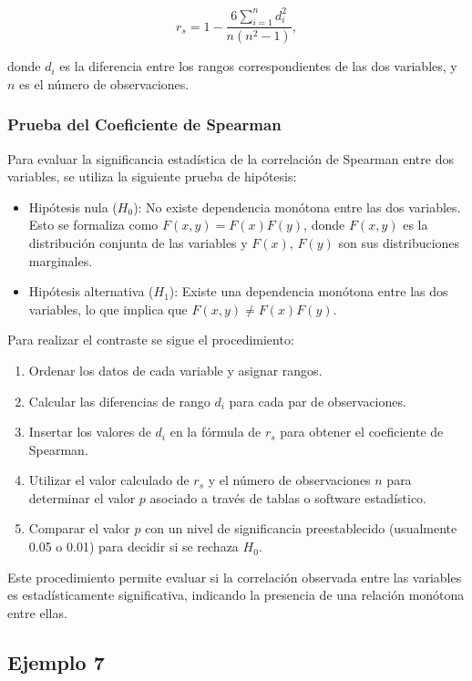 \documentclass{article}
\begin{document}
\[r_s = 1 - \frac{6 \sum_{i=1}^{n}d_i^2}{n(n^2 - 1)},\]

donde $d_i$ es la diferencia entre los rangos correspondientes de las dos variables, y $n$ es el número de observaciones.

\subsubsection*{Prueba del Coeficiente de Spearman}

Para evaluar la significancia estadística de la correlación de Spearman entre dos variables, se utiliza la siguiente prueba de hipótesis:

\begin{itemize}
    \item Hipótesis nula ($H_0$): No existe dependencia monótona entre las dos variables. Esto se formaliza como $F(x,y) = F(x)F(y)$, donde $F(x,y)$ es la distribución conjunta de las variables y $F(x)$, $F(y)$ son sus distribuciones marginales.
    \item Hipótesis alternativa ($H_1$): Existe una dependencia monótona entre las dos variables, lo que implica que $F(x,y) \neq F(x)F(y)$.
\end{itemize}

Para realizar el contraste se sigue el procedimiento:

\begin{enumerate}
    \item Ordenar los datos de cada variable y asignar rangos.
    \item Calcular las diferencias de rango $d_i$ para cada par de observaciones.
    \item Insertar los valores de $d_i$ en la fórmula de $r_s$ para obtener el coeficiente de Spearman.
    \item Utilizar el valor calculado de $r_s$ y el número de observaciones $n$ para determinar el valor $p$ asociado a través de tablas o software estadístico.
    \item Comparar el valor $p$ con un nivel de significancia preestablecido (usualmente 0.05 o 0.01) para decidir si se rechaza $H_0$.
\end{enumerate}

Este procedimiento permite evaluar si la correlación observada entre las variables es estadísticamente significativa, indicando la presencia de una relación monótona entre ellas.

\subsection*{Ejemplo 7}
\end{document}
